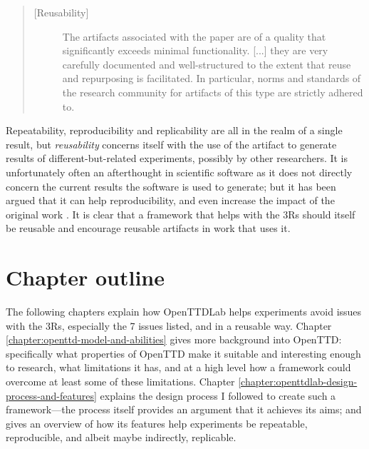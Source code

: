\documentclass[logo,msc,dsti]{style/infthesis}    %
\begin{document}
{\begin{quote}
\begin{description}
\item[{[}Reusability{]}] 
The artifacts associated with the paper are of a quality that significantly exceeds minimal functionality. [...] they are very carefully documented and well-structured to the extent that reuse and repurposing is facilitated. In particular, norms and standards of the research community for artifacts of this type are strictly adhered to. 
\end{description}
\end{quote}
Repeatability, reproducibility and replicability are all in the realm of a single result, but \emph{reusability} concerns itself with the use of the artifact to generate results of different-but-related experiments, possibly by other researchers. It is unfortunately often an afterthought in scientific software as it does not directly concern the current results the software is used to generate; but it has been argued that it can help reproducibility, and even increase the impact of the original work \cite{benureau2018re}. It is clear that a framework that helps with the 3Rs should itself be reusable and encourage reusable artifacts in work that uses it.

\section{Chapter outline}

The following chapters explain how OpenTTDLab helps experiments avoid issues with the 3Rs, especially the 7 issues listed, and in a reusable way. Chapter \ref{chapter:openttd-model-and-abilities} gives more background into OpenTTD: specifically what properties of OpenTTD make it suitable and interesting enough to research, what limitations it has, and at a high level how a framework could overcome at least some of these limitations. Chapter \ref{chapter:openttdlab-design-process-and-features} explains the design process I followed to create such a framework---the process itself provides an argument that it achieves its aims; and gives an overview of how its features help experiments be repeatable, reproducible, and albeit maybe indirectly, replicable. 

}
\end{document}
